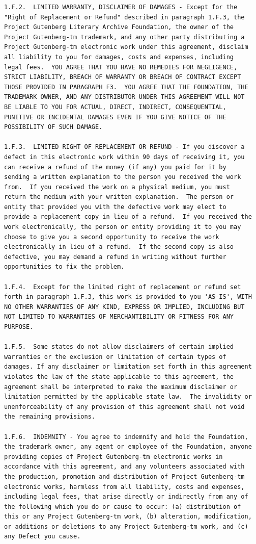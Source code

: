 \documentclass[oneside]{book}
\begin{document}
\begin{verbatim}
1.F.2.  LIMITED WARRANTY, DISCLAIMER OF DAMAGES - Except for the
"Right of Replacement or Refund" described in paragraph 1.F.3, the
Project Gutenberg Literary Archive Foundation, the owner of the
Project Gutenberg-tm trademark, and any other party distributing a
Project Gutenberg-tm electronic work under this agreement, disclaim
all liability to you for damages, costs and expenses, including
legal fees.  YOU AGREE THAT YOU HAVE NO REMEDIES FOR NEGLIGENCE,
STRICT LIABILITY, BREACH OF WARRANTY OR BREACH OF CONTRACT EXCEPT
THOSE PROVIDED IN PARAGRAPH F3.  YOU AGREE THAT THE FOUNDATION, THE
TRADEMARK OWNER, AND ANY DISTRIBUTOR UNDER THIS AGREEMENT WILL NOT
BE LIABLE TO YOU FOR ACTUAL, DIRECT, INDIRECT, CONSEQUENTIAL,
PUNITIVE OR INCIDENTAL DAMAGES EVEN IF YOU GIVE NOTICE OF THE
POSSIBILITY OF SUCH DAMAGE.

1.F.3.  LIMITED RIGHT OF REPLACEMENT OR REFUND - If you discover a
defect in this electronic work within 90 days of receiving it, you
can receive a refund of the money (if any) you paid for it by
sending a written explanation to the person you received the work
from.  If you received the work on a physical medium, you must
return the medium with your written explanation.  The person or
entity that provided you with the defective work may elect to
provide a replacement copy in lieu of a refund.  If you received the
work electronically, the person or entity providing it to you may
choose to give you a second opportunity to receive the work
electronically in lieu of a refund.  If the second copy is also
defective, you may demand a refund in writing without further
opportunities to fix the problem.

1.F.4.  Except for the limited right of replacement or refund set
forth in paragraph 1.F.3, this work is provided to you 'AS-IS', WITH
NO OTHER WARRANTIES OF ANY KIND, EXPRESS OR IMPLIED, INCLUDING BUT
NOT LIMITED TO WARRANTIES OF MERCHANTIBILITY OR FITNESS FOR ANY
PURPOSE.

1.F.5.  Some states do not allow disclaimers of certain implied
warranties or the exclusion or limitation of certain types of
damages. If any disclaimer or limitation set forth in this agreement
violates the law of the state applicable to this agreement, the
agreement shall be interpreted to make the maximum disclaimer or
limitation permitted by the applicable state law.  The invalidity or
unenforceability of any provision of this agreement shall not void
the remaining provisions.

1.F.6.  INDEMNITY - You agree to indemnify and hold the Foundation,
the trademark owner, any agent or employee of the Foundation, anyone
providing copies of Project Gutenberg-tm electronic works in
accordance with this agreement, and any volunteers associated with
the production, promotion and distribution of Project Gutenberg-tm
electronic works, harmless from all liability, costs and expenses,
including legal fees, that arise directly or indirectly from any of
the following which you do or cause to occur: (a) distribution of
this or any Project Gutenberg-tm work, (b) alteration, modification,
or additions or deletions to any Project Gutenberg-tm work, and (c)
any Defect you cause.



\end{verbatim}
\end{document}
